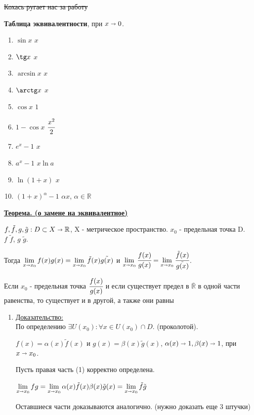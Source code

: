 \documentclass{article}
\newcommand{\thmm}[1]{\underline{\textbf{#1}}}
\newcommand{\prooff}[1]{{\underline{Доказательство:}} \\ }
\newcommand{\mytilde}{\raisebox{0.5ex}{\texttildelow}}
\begin{document}
\sout{Кохась ругает нас за работу}

\textbf{Таблица эквивалентности}, при $x\shortrightarrow 0$.

\begin{enumerate}
    \item $\sin x $ \mytilde $ x$
    \item $\tg x $ \mytilde $ x$
    \item $\arcsin x $ \mytilde $ x$
    \item $\arctg x $ \mytilde $ x$
    \item $\cos x $ \mytilde $ 1$
    \item $1 - \cos x $ \mytilde $ \cfrac{x^2}{2}$
    \item $e^x-1 $ \mytilde $ x$
    \item $a^x-1 $ \mytilde $ x \ln a$
    \item $\ln (1+x)$ \mytilde $x$
    \item $(1+x)^\alpha -1$ \mytilde $\alpha x$, $\alpha \in \mathbb{R}$
    
\end{enumerate}

\thmm{Теорема. (о замене на эквивалентное)}

$f,\tilde{f},g,\tilde{g}: D \subset X \shortrightarrow \mathbb{R}$, X - метрическое пространство. $x_0$ - предельная точка D.\,\, $f$ \mytilde $\tilde{f}$, $g$ \mytilde $\tilde{g}$.

Тогда $\lim\limits_{x\shortrightarrow x_0} f(x)g(x) = \lim\limits_{x\shortrightarrow x_0} \tilde{f}(x) \tilde{g(x)}$ и $\lim\limits_{x\shortrightarrow x_0} \cfrac{f(x)}{g(x)} = \lim\limits_{x\shortrightarrow x_0} \cfrac{\tilde{f}(x)}{ \tilde{g(x)}}$. 

Если $x_0$ - предельная точка $\cfrac{f(x)}{g(x)}$ и если существует предел в $\overline{\mathbb{R}}$ в одной части равенства, то существует и в другой, а также они равны

\begin{enumerate}
    \item[] \prooff{}
    По определению $\exists U(x_0): \forall x \in U(x_0) \cap D$. (проколотой).

    $f(x) = \alpha(x) \tilde{f}(x)$ и  $g(x) = \beta(x) \tilde{g}(x)$, 
    $\alpha(x) \shortrightarrow 1, \beta(x) \shortrightarrow 1$, при $x\shortrightarrow x_0$.

    Пусть правая часть (1) корректно определена.

    $\lim\limits_{x\shortrightarrow x_0} fg = \lim\limits_{x\shortrightarrow x_0} \alpha(x) \tilde{f}(x) \beta(x) \tilde{g}(x) = \lim\limits_{x\shortrightarrow x_0}\tilde{f}\tilde{g}$

    Оставшиеся части доказываются аналогично. (нужно доказать еще 3 штучки)
\end{enumerate}
\end{document}
